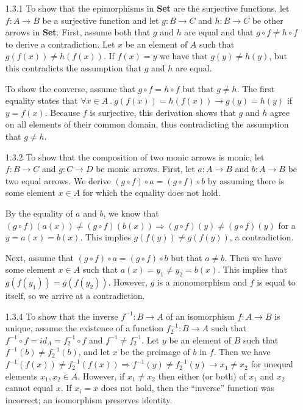 \documentclass{article}
\begin{document}
\begin{enumerate}
\item[1.3.1]
  To show that the epimorphisms in \textbf{Set} are the surjective functions, let $f : A \rightarrow B$ be a surjective function and let $g : B \rightarrow C$ and $h : B \rightarrow C$ be other arrows in \textbf{Set}.
  First, assume both that $g$ and $h$ are equal and that $g \circ f \ne h \circ f$ to derive a contradiction.
  Let $x$ be an element of $A$ such that $g(f(x)) \ne h(f(x))$.
  If $f(x) = y$ we have that $g(y) \ne h(y)$, but this contradicts the assumption that $g$ and $h$ are equal.

  To show the converse, assume that $g \circ f = h \circ f$ but that $g \ne h$.
  The first equality states that $\forall x\in A~.~g(f(x)) = h(f(x)) \rightarrow g(y) = h(y)$ if $y = f(x)$.
  Because $f$ is surjective, this derivation shows that $g$ and $h$ agree on all elements of their common domain, thus contradicting the assumption that $g \ne h$.

\item [1.3.2]
  To show that the composition of two monic arrows is monic, let $f : B \rightarrow C$ and $g : C \rightarrow D$ be monic arrows.
  First, let $a : A \rightarrow B$ and $b : A \rightarrow B$ be two equal arrows.
  We derive $(g \circ f) \circ a = (g \circ f) \circ b$ by assuming there is some element $x \in A$ for which the equality does not hold.

  By the equality of $a$ and $b$, we know that $(g\circ f)(a(x)) \ne (g\circ f)(b(x)) \Rightarrow (g\circ f)(y) \ne (g\circ f)(y)$ for a $y = a(x) = b(x)$.
  This implies $g(f(y)) \ne g(f(y))$, a contradiction.

  Next, assume that $(g\circ f) \circ a = (g\circ f) \circ b$ but that $a \ne b$.
  Then we have some element $x \in A$ such that $a(x) = y_1 \ne y_2 = b(x)$.
  This implies that $g(f(y_1)) = g(f(y_2))$.
  However, $g$ is a monomorphism and $f$ is equal to itself, so we arrive at a contradiction.


  

\item[]
\item[1.3.4]
  To show that the inverse $f^{-1} : B \rightarrow A$ of an isomorphism $f : A\rightarrow B$ is unique, assume the existence of a function $f^{-1}_2 : B \rightarrow A$ such that $f^{-1} \circ f = id_A = f^{-1}_2 \circ f$ and $f^{-1} \ne f^{-1}_2$.
  Let $y$ be an element of $B$ such that $f^{-1}(b) \ne f^{-1}_2(b)$, and let $x$ be the preimage of $b$ in $f$.
  Then we have $f^{-1}(f(x)) \ne f^{-1}_2(f(x)) \Rightarrow f^{-1}(y) \ne f^{-1}_2(y) \rightarrow x_1 \ne x_2$ for unequal elements $x_1,x_2 \in A$.
  However, if $x_1 \ne x_2$ then either (or both) of $x_1$ and $x_2$ cannot equal $x$.
  If $x_i = x$ does not hold, then the ``inverse'' function was incorrect; an isomorphism preserves identity.


\end{enumerate}
\end{document}
